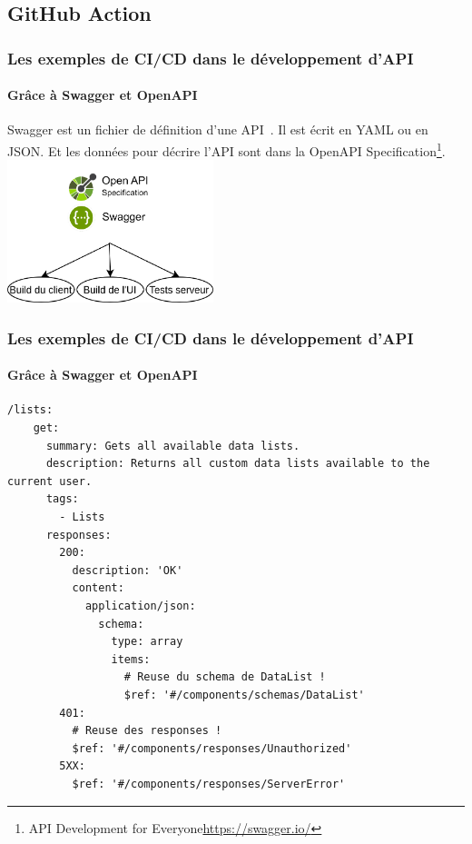 \documentclass{beamer}
\begin{document}
    \subsection{GitHub Action}\label{subsec:github-action}
    \begin{frame}
        \frametitle{Les exemples de CI/CD dans le développement d'API}
        \framesubtitle{Grâce à Swagger et OpenAPI}
        \transdissolve
        Swagger est un fichier de définition d'une API~.
        Il est écrit en YAML ou en JSON. Et les données pour décrire l'API sont dans la OpenAPI Specification\footnote{API Development for Everyone\url{https://swagger.io/}}.
        \break
        \centering
        \includegraphics[width=6cm]{image/swagger-capacity.drawio}
    \end{frame}

    \begin{frame}[fragile]
        \frametitle{Les exemples de CI/CD dans le développement d'API}
        \framesubtitle{Grâce à Swagger et OpenAPI}
        \transdissolve
        \begin{lstlisting}
/lists:
    get:
      summary: Gets all available data lists.
      description: Returns all custom data lists available to the current user.
      tags:
        - Lists
      responses:
        200:
          description: 'OK'
          content:
            application/json:
              schema:
                type: array
                items:
                  # Reuse du schema de DataList !
                  $ref: '#/components/schemas/DataList'
        401:
          # Reuse des responses !
          $ref: '#/components/responses/Unauthorized'
        5XX:
          $ref: '#/components/responses/ServerError'
        \end{lstlisting}
    \end{frame}
\end{document}
